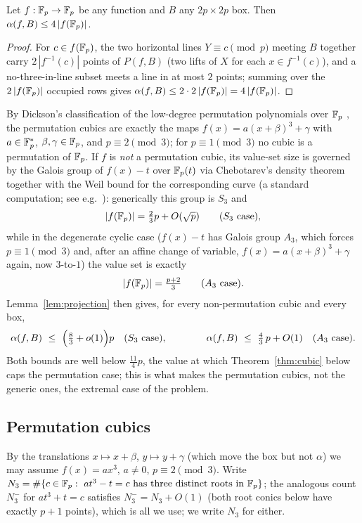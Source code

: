 \begin{lemma}\label{lem:projection}
Let $f:\mathbb{F}_p\to\mathbb{F}_p$ be any function and $B$ any $2p\times2p$ box. Then $\alpha(f,B)\le4\,|f(\mathbb{F}_p)|$.
\end{lemma}
\begin{proof}
For $c\in f(\mathbb{F}_p)$, the two horizontal lines $Y\equiv c\pmod p$ meeting $B$ together carry $2\,|f^{-1}(c)|$ points of
$P(f,B)$ (two lifts of $X$ for each $x\in f^{-1}(c)$), and a no-three-in-line subset meets a line in at most $2$
points; summing over the $2\,|f(\mathbb{F}_p)|$ occupied rows gives $\alpha(f,B)\le2\cdot2\,|f(\mathbb{F}_p)|=4\,|f(\mathbb{F}_p)|$.
\end{proof}

By Dickson's classification of the low-degree permutation polynomials over $\mathbb{F}_p$ \cite{Dickson1897,LidlNiederreiter},
the permutation cubics are exactly the maps $f(x)=a(x+\beta)^3+\gamma$ with $a\in\mathbb{F}_p^*$, $\beta,\gamma\in\mathbb{F}_p$, and
$p\equiv2\pmod3$; for $p\equiv1\pmod3$ no cubic is a permutation of $\mathbb{F}_p$. If $f$ is \emph{not} a permutation cubic,
its value-set size is governed by the Galois group of $f(x)-t$ over $\mathbb{F}_p(t)$ via Chebotarev's density theorem
together with the Weil bound for the corresponding curve (a standard computation; see e.g.\ \cite{IK,LidlNiederreiter}):
generically this group is $S_3$ and
\[
|f(\mathbb{F}_p)|=\tfrac23p+O(\sqrt p)\qquad(S_3\ \text{case}),
\]
while in the degenerate cyclic case ($f(x)-t$ has Galois group $A_3$, which forces $p\equiv1\pmod3$ and, after an
affine change of variable, $f(x)=a(x+\beta)^3+\gamma$ again, now $3$-to-$1$) the value set is exactly
\[
|f(\Fp)|=\tfrac{p+2}3\qquad(A_3\ \text{case}).
\]
Lemma~\ref{lem:projection} then gives, for every non-permutation cubic and every box,
\begin{equation}\label{eq:nonperm}
\alpha(f,B)\ \le\ \Bigl(\tfrac83+o(1)\Bigr)p\quad(S_3\ \text{case}),\qquad\qquad
\alpha(f,B)\ \le\ \tfrac43\,p+O(1)\quad(A_3\ \text{case}).
\end{equation}
Both bounds are well below $\tfrac{11}4p$, the value at which Theorem~\ref{thm:cubic} below caps the permutation
case; this is what makes the permutation cubics, not the generic ones, the extremal case of the problem.

\subsection*{Permutation cubics}

By the translations $x\mapsto x+\beta$, $y\mapsto y+\gamma$ (which move the box but not $\alpha$) we may assume
$f(x)=ax^3$, $a\ne0$, $p\equiv2\pmod3$. Write $N_3=\#\{c\in\mathbb{F}_p:\ at^3-t=c\ \text{has three distinct roots in }\mathbb{F}_p\}$;
the analogous count $N_3^-$ for $at^3+t=c$ satisfies $N_3^-=N_3+O(1)$ (both root conics below have exactly $p+1$
points), which is all we use; we write $N_3$ for either.

